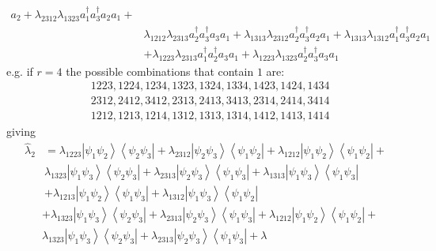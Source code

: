 \documentclass[aps,preprint]{revtex4}%
\begin{document}
\begin{itemize}
\begin{align}
a_{2}+\lambda_{2312}\lambda_{1323}a_{1}^{\dagger}a_{3}^{\dagger}a_{2}%
a_{1}+\nonumber\\
&  \lambda_{1212}\lambda_{2313}a_{2}^{\dagger}a_{3}^{\dagger}a_{3}%
a_{1}+\lambda_{1313}\lambda_{2312}a_{2}^{\dagger}a_{3}^{\dagger}a_{2}%
a_{1}+\lambda_{1313}\lambda_{1312}a_{1}^{\dagger}a_{3}^{\dagger}a_{2}a_{1}\\
&  +\lambda_{1223}\lambda_{2313}a_{1}^{\dagger}a_{2}^{\dagger}a_{3}%
a_{1}+\lambda_{1223}\lambda_{1323}a_{2}^{\dagger}a_{3}^{\dagger}a_{3}a_{1}%
\end{align}
e.g. if $r=4$ the possible combinations that contain $1$ are:%
\begin{align}
&  1223,1224,1234,1323,1324,1334,1423,1424,1434\nonumber\\
&  2312,2412,3412,2313,2413,3413,2314,2414,3414\nonumber\\
&  1212,1213,1214,1312,1313,1314,1412,1413,1414
\end{align}
giving%
\begin{align}
\hat{\lambda}_{2}  &  =\lambda_{1223}\left\vert \psi_{1}\psi_{2}\right\rangle
\left\langle \psi_{2}\psi_{3}\right\vert +\lambda_{2312}\left\vert \psi
_{2}\psi_{3}\right\rangle \left\langle \psi_{1}\psi_{2}\right\vert
+\lambda_{1212}\left\vert \psi_{1}\psi_{2}\right\rangle \left\langle \psi
_{1}\psi_{2}\right\vert +\\
&  \lambda_{1323}\left\vert \psi_{1}\psi_{3}\right\rangle \left\langle
\psi_{2}\psi_{3}\right\vert +\lambda_{2313}\left\vert \psi_{2}\psi
_{3}\right\rangle \left\langle \psi_{1}\psi_{3}\right\vert +\lambda
_{1313}\left\vert \psi_{1}\psi_{3}\right\rangle \left\langle \psi_{1}\psi
_{3}\right\vert \\
&  +\lambda_{1213}\left\vert \psi_{1}\psi_{2}\right\rangle \left\langle
\psi_{1}\psi_{3}\right\vert +\lambda_{1312}\left\vert \psi_{1}\psi
_{3}\right\rangle \left\langle \psi_{1}\psi_{2}\right\vert
\end{align}%
\begin{align}
&  +\lambda_{1323}\left\vert \psi_{1}\psi_{3}\right\rangle \left\langle
\psi_{2}\psi_{3}\right\vert +\lambda_{2313}\left\vert \psi_{2}\psi
_{3}\right\rangle \left\langle \psi_{1}\psi_{3}\right\vert +\lambda
_{1212}\left\vert \psi_{1}\psi_{2}\right\rangle \left\langle \psi_{1}\psi
_{2}\right\vert +\\
&  \lambda_{1323}\left\vert \psi_{1}\psi_{3}\right\rangle \left\langle
\psi_{2}\psi_{3}\right\vert +\lambda_{2313}\left\vert \psi_{2}\psi
_{3}\right\rangle \left\langle \psi_{1}\psi_{3}\right\vert +\lambda

\end{align}
\end{itemize}
\end{document}

